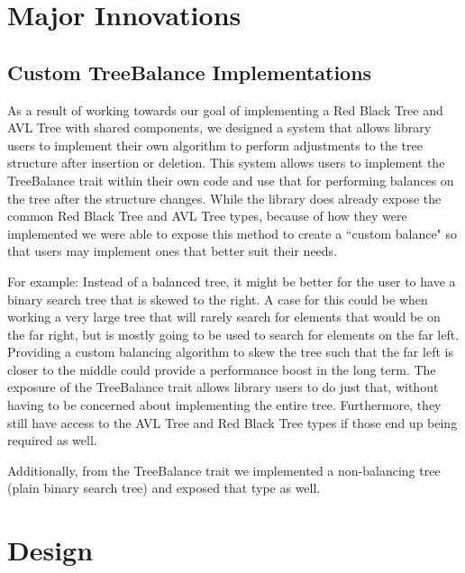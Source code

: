 \documentclass[11pt, letterpaper]{article}
\title{\textbf{\Huge{ 
\begin{center}
    Balanced Binary Tree Crate Report %
\end{center} 
}}}
\author{
    Mackenzie Malainey - \texttt{mmalaine@ualberta.ca} \\
    Lora Ma - \texttt{lora@ualberta.ca} \\
    Benjamin Kong - \texttt{bkong@ualberta.ca} \\\\
}
\begin{document}
\maketitle
\newpage
{
  \hypersetup{}
  \parskip 0pt
  \tableofcontents
} %
\newpage

\section{Major Innovations}

\subsection{Custom TreeBalance Implementations}
As a result of working towards our goal of implementing a Red Black Tree and AVL Tree with shared components,
we designed a system that allows library users to implement their own algorithm to perform adjustments
to the tree structure after insertion or deletion.  This system allows users to implement the TreeBalance
trait within their own code and use that for performing balances on the tree after the structure changes.
While the library does already expose the common Red Black Tree and AVL Tree types, because of how they were implemented
we were able to expose this method to create a ``custom balance" so that users may implement ones that better suit their needs.

For example:
Instead of a balanced tree, it might be better for the user to have a binary search tree that is skewed to the right.
A case for this could be when working a very large tree that will rarely search for elements that would be on the far right,
but is mostly going to be used to search for elements on the far left.  Providing a custom balancing algorithm to skew the tree
such that the far left is closer to the middle could provide a performance boost in the long term.  The exposure of the
TreeBalance trait allows library users to do just that, without having to be concerned about implementing the entire tree.
Furthermore, they still have access to the AVL Tree and Red Black Tree types if those end up being required as well.

Additionally, from the TreeBalance trait we implemented a non-balancing tree (plain binary search tree) and exposed that type as well.

\newpage
\section{Design}
\end{document}
